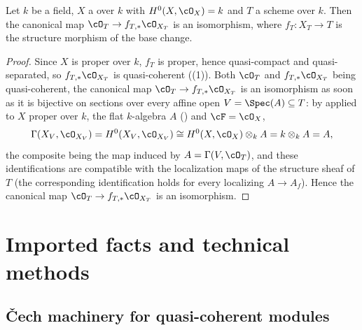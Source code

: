 \begin{lemma}
\label{lem:pc-structure-pushforward}
Let $k$ be a field, $X$ a
 over
$k$ with $H^0(X,\cO_X)=k$ and $T$ a scheme over $k$.  Then the
canonical map $\cO_T\to f_{T,*}\cO_{X_T}$ is an isomorphism, where
$f_T:X_T\to T$ is the structure morphism of the base change.
\end{lemma}
\begin{proof}
Since $X$ is proper over $k$, $f_T$ is proper, hence quasi-compact and
quasi-separated, so $f_{T,*}\cO_{X_T}$ is quasi-coherent
((1)).  Both $\cO_T$ and $f_{T,*}\cO_{X_T}$
being quasi-coherent, the canonical map $\cO_T\to f_{T,*}\cO_{X_T}$ is an
isomorphism as soon as it is bijective on sections over every affine open
$V=\Spec(A)\subseteq T$: by
 applied to $X$ proper over $k$,
the flat $k$-algebra $A$ () and $\cF=\cO_X$,
\[
\Gamma(X_V,\cO_{X_V})=H^0(X_V,\cO_{X_V})\cong H^0(X,\cO_X)\otimes_kA
=k\otimes_kA=A ,
\]
the composite being the map induced by $A=\Gamma(V,\cO_T)$, and these
identifications are compatible with the localization maps of the
structure sheaf of $T$ (the corresponding identification holds for every
localizing $A\to A_f$).  Hence the canonical map
$\cO_T\to f_{T,*}\cO_{X_T}$ is an isomorphism.
\end{proof}

\section{Imported facts and technical methods}\label{sec:facts}

\subsection{Čech machinery for quasi-coherent modules}

